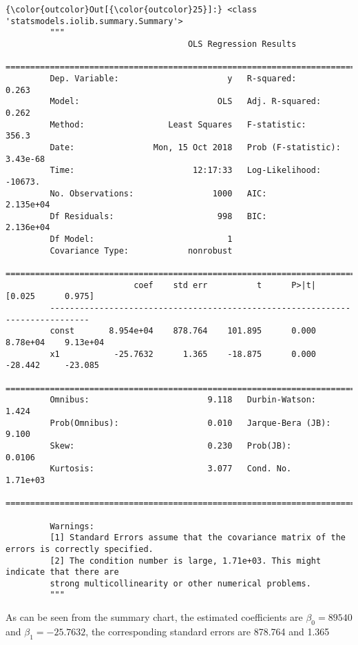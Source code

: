 \documentclass[11pt]{article}
\begin{document}
\begin{Verbatim}[commandchars=\\\{\}]
{\color{outcolor}Out[{\color{outcolor}25}]:} <class 'statsmodels.iolib.summary.Summary'>
         """
                                     OLS Regression Results                            
         ==============================================================================
         Dep. Variable:                      y   R-squared:                       0.263
         Model:                            OLS   Adj. R-squared:                  0.262
         Method:                 Least Squares   F-statistic:                     356.3
         Date:                Mon, 15 Oct 2018   Prob (F-statistic):           3.43e-68
         Time:                        12:17:33   Log-Likelihood:                -10673.
         No. Observations:                1000   AIC:                         2.135e+04
         Df Residuals:                     998   BIC:                         2.136e+04
         Df Model:                           1                                         
         Covariance Type:            nonrobust                                         
         ==============================================================================
                          coef    std err          t      P>|t|      [0.025      0.975]
         ------------------------------------------------------------------------------
         const       8.954e+04    878.764    101.895      0.000    8.78e+04    9.13e+04
         x1           -25.7632      1.365    -18.875      0.000     -28.442     -23.085
         ==============================================================================
         Omnibus:                        9.118   Durbin-Watson:                   1.424
         Prob(Omnibus):                  0.010   Jarque-Bera (JB):                9.100
         Skew:                           0.230   Prob(JB):                       0.0106
         Kurtosis:                       3.077   Cond. No.                     1.71e+03
         ==============================================================================
         
         Warnings:
         [1] Standard Errors assume that the covariance matrix of the errors is correctly specified.
         [2] The condition number is large, 1.71e+03. This might indicate that there are
         strong multicollinearity or other numerical problems.
         """
\end{Verbatim}
            
    As can be seen from the summary chart, the estimated coefficients are
\(\beta_0=89540\) and \(\beta_1=-25.7632\), the corresponding standard
errors are 878.764 and 1.365
\end{document}
